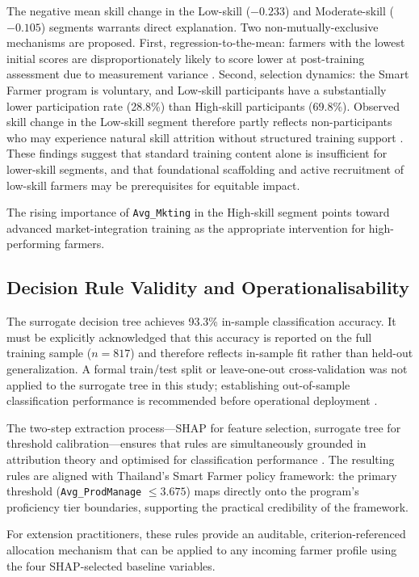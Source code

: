 \documentclass[3p,twocolumn,authoryear]{elsarticle}
\begin{document}
The negative mean skill change in the Low-skill ($-0.233$) and
Moderate-skill ($-0.105$) segments warrants direct explanation.
Two non-mutually-exclusive mechanisms are proposed.
First, regression-to-the-mean: farmers with the lowest initial scores
are disproportionately likely to score lower at post-training assessment
due to measurement variance \citep{davis2012}.
Second, selection dynamics: the Smart Farmer program is voluntary, and
Low-skill participants have a substantially lower participation rate
(28.8\%) than High-skill participants (69.8\%).
Observed skill change in the Low-skill segment therefore partly reflects
non-participants who may experience natural skill attrition without
structured training support \citep{anderson2004}.
These findings suggest that standard training content alone is
insufficient for lower-skill segments, and that foundational scaffolding
and active recruitment of low-skill farmers may be prerequisites for
equitable impact.

The rising importance of \texttt{Avg\_Mkting} in the High-skill segment
points toward advanced market-integration training as the appropriate
intervention for high-performing farmers.

\subsection{Decision Rule Validity and Operationalisability}

The surrogate decision tree achieves 93.3\% in-sample classification
accuracy.
It must be explicitly acknowledged that this accuracy is reported on the
full training sample ($n = 817$) and therefore reflects in-sample fit
rather than held-out generalization.
A formal train/test split or leave-one-out cross-validation was not
applied to the surrogate tree in this study; establishing out-of-sample
classification performance is recommended before operational deployment
\citep{guidotti2019}.

The two-step extraction process---SHAP for feature selection, surrogate
tree for threshold calibration---ensures that rules are simultaneously
grounded in attribution theory and optimised for classification
performance \citep{molnar2022}.
The resulting rules are aligned with Thailand's Smart Farmer policy
framework: the primary threshold (\texttt{Avg\_ProdManage} $\leq 3.675$) maps
directly onto the program's proficiency tier boundaries, supporting the
practical credibility of the framework.

For extension practitioners, these rules provide an auditable,
criterion-referenced allocation mechanism that can be applied to any
incoming farmer profile using the four SHAP-selected baseline variables.
\end{document}
